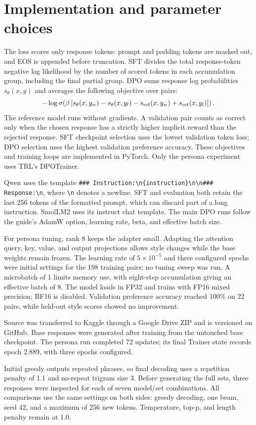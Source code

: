 \documentclass[10pt,a4paper]{article}
\begin{document}
\section{Implementation and parameter choices}
The loss scores only response tokens: prompt and padding tokens are masked out, and EOS is appended before truncation. SFT divides the total response-token negative log likelihood by the number of scored tokens in each accumulation group, including the final partial group. DPO sums response log probabilities $s_\theta(x,y)$ and averages the following objective over pairs:
\[
-\log\sigma\!\left(\beta\left[s_\theta(x,y_w)-s_\theta(x,y_l)-s_{\rm ref}(x,y_w)+s_{\rm ref}(x,y_l)\right]\right).
\]
The reference model runs without gradients. A validation pair counts as correct only when the chosen response has a strictly higher implicit reward than the rejected response. SFT checkpoint selection uses the lowest validation token loss; DPO selection uses the highest validation preference accuracy. These objectives and training loops are implemented in PyTorch. Only the persona experiment uses TRL's DPOTrainer.

Qwen uses the template \verb|### Instruction:\n{instruction}\n\n### Response:\n|, where \verb|\n| denotes a newline. SFT and evaluation both retain the last 256 tokens of the formatted prompt, which can discard part of a long instruction. SmolLM2 uses its instruct chat template. The main DPO runs follow the guide's AdamW option, learning rate, beta, and effective batch size.

For persona tuning, rank 8 keeps the adapter small. Adapting the attention query, key, value, and output projections allows style changes while the base weights remain frozen. The learning rate of $5\times10^{-5}$ and three configured epochs were initial settings for the 198 training pairs; no tuning sweep was run. A microbatch of 1 limits memory use, with eight-step accumulation giving an effective batch of 8. The model loads in FP32 and trains with FP16 mixed precision; BF16 is disabled. Validation preference accuracy reached 100\% on 22 pairs, while held-out style scores showed no improvement.

Source was transferred to Kaggle through a Google Drive ZIP and is versioned on GitHub. Base responses were generated after training from the untouched base checkpoint. The persona run completed 72 updates; its final Trainer state records epoch 2.889, with three epochs configured.

Initial greedy outputs repeated phrases, so final decoding uses a repetition penalty of 1.1 and no-repeat trigram size 3. Before generating the full sets, three responses were inspected for each of seven model/set combinations. All comparisons use the same settings on both sides: greedy decoding, one beam, seed 42, and a maximum of 256 new tokens. Temperature, top-p, and length penalty remain at 1.0.
\end{document}
